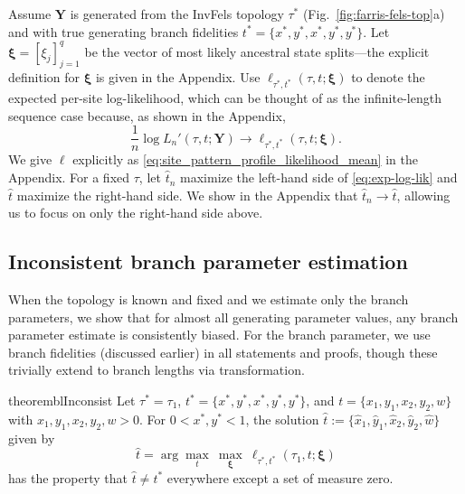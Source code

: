 \documentclass[11pt]{article}
\newcommand{\fullAlignment}{\mathbf{Y}}
\newcommand{\nCols}{n}
\newcommand{\nSiteSplits}{q}
\begin{document}
Assume $\fullAlignment$ is generated from the InvFels topology $\tau^*$ (Fig.~\ref{fig:farris-fels-top}a) and with true generating branch fidelities $t^*=\{x^*, y^*, x^*, y^*, y^*\}$.
Let $\boldsymbol\xi = [\xi_j]_{j=1}^\nSiteSplits$ be the vector of most likely ancestral state splits---the explicit definition for $\boldsymbol\xi$ is given in the Appendix.
Use $\ell_{\tau^*,t^*}(\tau, t; \boldsymbol\xi)$ to denote the expected per-site log-likelihood, which can be thought of as the infinite-length sequence case because, as shown in the Appendix,
\begin{equation}
\label{eq:exp-log-lik}
\frac{1}{n}\log L_\nCols'(\tau, t; \fullAlignment) \rightarrow \ell_{\tau^*,t^*}(\tau, t; \boldsymbol\xi).
\end{equation}
We give $\ell$ explicitly as \eqref{eq:site_pattern_profile_likelihood_mean} in the Appendix.
For a fixed $\tau$, let $\hat{t}_\nCols$ maximize the left-hand side of \eqref{eq:exp-log-lik} and $\hat{t}$ maximize the right-hand side.
We show in the Appendix that $\hat{t}_\nCols \rightarrow \hat{t}$, allowing us to focus on only the right-hand side above.


\subsection*{Inconsistent branch parameter estimation}
When the topology is known and fixed and we estimate only the branch parameters, we show that for almost all generating parameter values, any branch parameter estimate is consistently biased.
For the branch parameter, we use branch fidelities (discussed earlier) in all statements and proofs, though these trivially extend to branch lengths via transformation.

\begin{restatable}{theorem}{blInconsist}
\label{thm:bl_theorem}
Let $\tau^*=\tau_1$, $t^*=\{x^*, y^*, x^*, y^*, y^*\}$, and $t=\{x_1, y_1, x_2, y_2, w\}$ with $x_1, y_1, x_2, y_2, w > 0$.
For $0 < x^*, y^* < 1$, the solution $\hat{t} := \{\hat{x}_1,\hat{y}_1,\hat{x}_2,\hat{y}_2,\hat{w}\}$ given by
\[
\hat{t} = \arg\max_{t} \ \max_{\boldsymbol\xi} \ \ell_{\tau^*,t^*}(\tau_1, t; \boldsymbol\xi)
\]
has the property that $\hat{t} \neq t^*$ everywhere except a set of measure zero.
\end{restatable}
\end{document}
